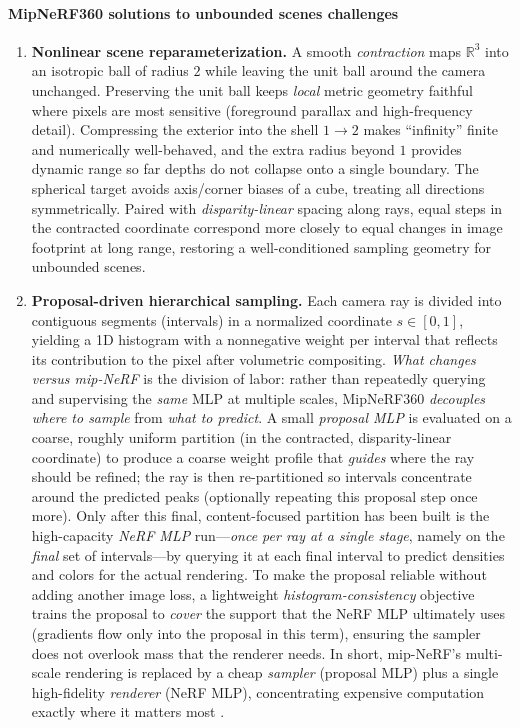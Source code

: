 \begin{enrichment}
\begin{enrichment}
        \paragraph{MipNeRF360 solutions to unbounded scenes challenges}
        \begin{enumerate}
            \item \textbf{Nonlinear scene reparameterization.} A smooth \emph{contraction} maps \(\mathbb{R}^3\) into an isotropic ball of radius \(2\) while leaving the unit ball around the camera unchanged. Preserving the unit ball keeps \emph{local} metric geometry faithful where pixels are most sensitive (foreground parallax and high-frequency detail). Compressing the exterior into the shell \(1\!\to\!2\) makes “infinity” finite and numerically well-behaved, and the extra radius beyond \(1\) provides dynamic range so far depths do not collapse onto a single boundary. The spherical target avoids axis/corner biases of a cube, treating all directions symmetrically. Paired with \emph{disparity-linear} spacing along rays, equal steps in the contracted coordinate correspond more closely to equal changes in image footprint at long range, restoring a well-conditioned sampling geometry for unbounded scenes.
            
            \item \textbf{Proposal-driven hierarchical sampling.} Each camera ray is divided into contiguous segments (intervals) in a normalized coordinate \(s\in[0,1]\), yielding a 1D histogram with a nonnegative weight per interval that reflects its contribution to the pixel after volumetric compositing. \emph{What changes versus mip-NeRF} is the division of labor: rather than repeatedly querying and supervising the \emph{same} MLP at multiple scales, MipNeRF360 \cite{barron2022_mipnerf360} \emph{decouples} \emph{where to sample} from \emph{what to predict}. A small \emph{proposal MLP} is evaluated on a coarse, roughly uniform partition (in the contracted, disparity-linear coordinate) to produce a coarse weight profile that \emph{guides} where the ray should be refined; the ray is then re-partitioned so intervals concentrate around the predicted peaks (optionally repeating this proposal step once more). Only after this final, content-focused partition has been built is the high-capacity \emph{NeRF MLP} run—\emph{once per ray at a single stage}, namely on the \emph{final} set of intervals—by querying it at each final interval to predict densities and colors for the actual rendering. To make the proposal reliable without adding another image loss, a lightweight \emph{histogram-consistency} objective trains the proposal to \emph{cover} the support that the NeRF MLP ultimately uses (gradients flow only into the proposal in this term), ensuring the sampler does not overlook mass that the renderer needs. In short, mip-NeRF’s multi-scale rendering is replaced by a cheap \emph{sampler} (proposal MLP) plus a single high-fidelity \emph{renderer} (NeRF MLP), concentrating expensive computation exactly where it matters most \cite{barron2022_mipnerf360}.
            

\end{enumerate}
\end{enrichment}
\end{enrichment}
